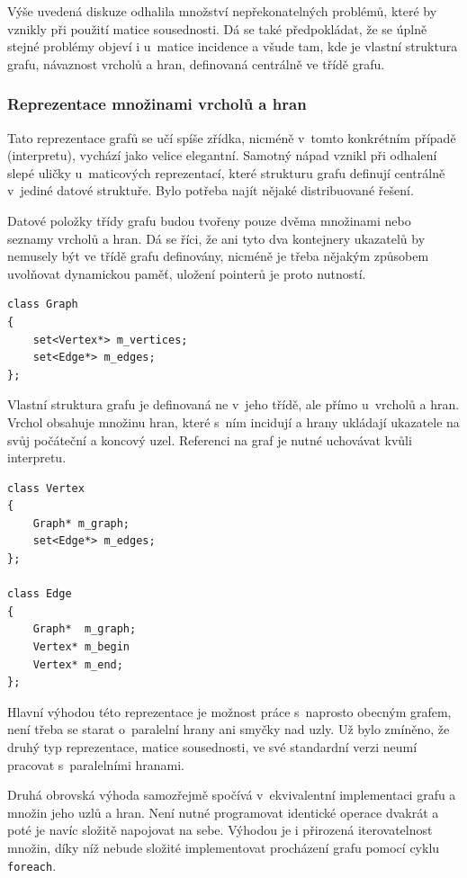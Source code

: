 \documentclass[11pt,twoside,a4paper]{book}
\begin{document}
Výše uvedená diskuze odhalila množství nepřekonatelných problémů, které by vznikly při použití matice sousednosti. Dá se také předpokládat, že se úplně stejné problémy objeví i u~matice incidence a všude tam, kde je vlastní struktura grafu, návaznost vrcholů a hran, definovaná centrálně ve třídě grafu.


\subsubsection{Reprezentace množinami vrcholů a hran}
\label{reprezentace_mnozinami_vrcholu_a_hran}

Tato reprezentace grafů se učí spíše zřídka, nicméně v~tomto konkrétním případě (interpretu), vychází jako velice elegantní. Samotný nápad vznikl při odhalení slepé uličky u~maticových reprezentací, které strukturu grafu definují centrálně v~jediné datové struktuře. Bylo potřeba najít nějaké distribuované řešení.

Datové položky třídy grafu budou tvořeny pouze dvěma množinami nebo seznamy vrcholů a hran. Dá se říci, že ani tyto dva kontejnery ukazatelů by nemusely být ve třídě grafu definovány, nicméně je třeba nějakým způsobem uvolňovat dynamickou paměť, uložení pointerů je proto nutností.

\begin{verbatim}
class Graph
{
    set<Vertex*> m_vertices;
    set<Edge*> m_edges;
};
\end{verbatim}

Vlastní struktura grafu je definovaná ne v~jeho třídě, ale přímo u~vrcholů a hran. Vrchol obsahuje množinu hran, které s~ním incidují a hrany ukládají ukazatele na svůj počáteční a koncový uzel. Referenci na graf je nutné uchovávat kvůli interpretu.

\begin{verbatim}
class Vertex
{
    Graph* m_graph;
    set<Edge*> m_edges;
};

class Edge
{
    Graph*  m_graph;
    Vertex* m_begin
    Vertex* m_end;
};
\end{verbatim}

Hlavní výhodou této reprezentace je možnost práce s~naprosto obecným grafem, není třeba se starat o~paralelní hrany ani smyčky nad uzly. Už bylo zmíněno, že druhý typ reprezentace, matice sousednosti, ve své standardní verzi neumí pracovat s~paralelními hranami.

Druhá obrovská výhoda samozřejmě spočívá v~ekvivalentní implementaci grafu a množin jeho uzlů a hran. Není nutné programovat identické operace dvakrát a poté je navíc složitě napojovat na sebe. Výhodou je i přirozená iterovatelnost množin, díky níž nebude složité implementovat procházení grafu pomocí cyklu \texttt{foreach}.
\end{document}
